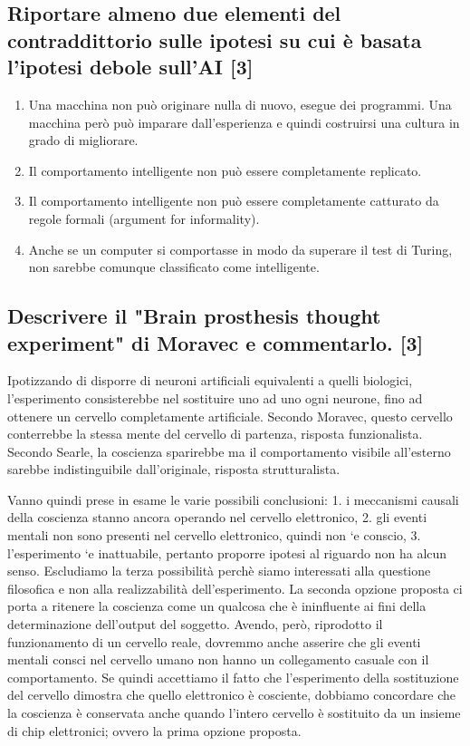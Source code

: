 \documentclass[\main/main.tex]{subfiles}
\begin{document}
\subsection{Riportare almeno due elementi del contraddittorio sulle ipotesi su cui è basata l'ipotesi debole sull'AI [3]}
\begin{enumerate}
  \item Una macchina non può originare nulla di nuovo, esegue dei programmi. Una macchina però può imparare dall’esperienza e quindi costruirsi una cultura in grado di migliorare.
  \item Il comportamento intelligente non può essere completamente replicato.
  \item Il comportamento intelligente non può essere completamente catturato da regole formali (argument for informality).
  \item Anche se un computer si comportasse in modo da superare il test di Turing, non sarebbe comunque classificato come intelligente.
\end{enumerate}

\subsection{Descrivere il "Brain prosthesis thought experiment" di Moravec e commentarlo. [3]}
Ipotizzando di disporre di neuroni artificiali equivalenti a quelli biologici, l’esperimento consisterebbe nel sostituire uno ad uno ogni neurone, fino ad ottenere un cervello completamente artificiale. Secondo Moravec, questo cervello conterrebbe la stessa mente del cervello di partenza, risposta funzionalista. Secondo Searle, la coscienza sparirebbe ma il comportamento visibile all’esterno sarebbe indistinguibile dall’originale, risposta strutturalista.

Vanno quindi prese in esame le varie possibili conclusioni: 1. i meccanismi causali della coscienza stanno ancora operando nel cervello elettronico, 2. gli eventi mentali non sono presenti nel cervello elettronico, quindi non `e conscio, 3. l’esperimento `e inattuabile, pertanto proporre ipotesi al riguardo non ha alcun senso. Escludiamo la terza possibilità perchè siamo interessati alla questione filosofica e non alla realizzabilità dell’esperimento. La seconda opzione proposta ci porta a ritenere la coscienza come un qualcosa che è ininfluente ai fini della determinazione dell’output del soggetto. Avendo, però, riprodotto il funzionamento di un cervello reale, dovremmo anche asserire che gli eventi mentali consci nel cervello umano non hanno un collegamento casuale con il comportamento. Se quindi accettiamo il fatto che l’esperimento della sostituzione del cervello dimostra che quello elettronico è cosciente, dobbiamo concordare che la coscienza è conservata anche quando l’intero cervello è sostituito da un insieme di chip elettronici; ovvero la prima opzione proposta.
\end{document}
